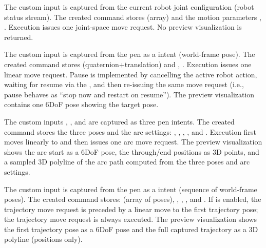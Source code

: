 The custom input  is captured from the current robot joint configuration (robot status stream).
The created command stores  (array) and the motion parameters , .
Execution issues one joint-space move request. 
No preview visualization is returned.

The custom input  is captured from the pen as a  intent (world-frame pose).
The created command stores  (quaternion+translation) and , .
Execution issues one linear move request. Pause is implemented by cancelling the active robot action, waiting for resume via the , and then re-issuing the same move request (i.e., pause behaves as ``stop now and restart on resume''). 
The preview visualization contains one 6DoF pose showing the target pose.

The custom inputs , , and  are captured as three pen  intents.
The created command stores the three poses and the arc settings:
, , , , and .
Execution first moves linearly to  and then issues one arc move request. 
The preview visualization shows the arc start as a 6DoF pose, the through/end positions as 3D points, and a sampled 3D polyline of the arc path computed from the three poses and arc settings.

The custom input  is captured from the pen as a  intent (sequence of world-frame poses).
The created command stores:
 (array of poses), , , , and .
If  is enabled, the trajectory move request is preceded by a linear move to the first trajectory pose; the trajectory move request is always executed.
The preview visualization shows the first trajectory pose as a 6DoF pose and the full captured trajectory as a 3D polyline (positions only).





